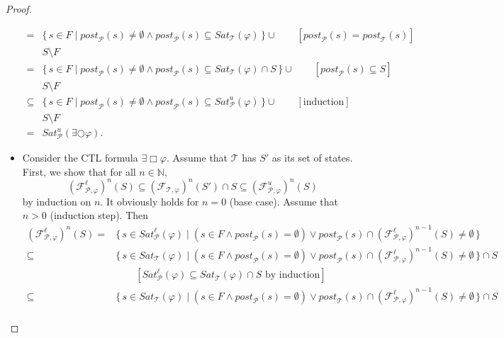 \documentclass[12pt]{article}
\newcommand{\always}{\Box}
\newcommand{\nxt}{\bigcirc}
\theoremstyle{definition}
\newcommand{\comment}[1]{\hspace{2em}[\mbox{#1}]}
\begin{document}
\begin{proof}
\begin{itemize}
\begin{align*}
= & \{\, s \in F \mid \mathit{post}_{\mathcal{P}}(s) \not= \emptyset \wedge \mathit{post}_{\mathcal{P}}(s) \subseteq \mathit{Sat}_{\mathcal{T}}(\varphi) \,\} \cup
\comment{$\mathit{post}_{\mathcal{P}}(s) = \mathit{post}_{\mathcal{T}}(s)$}\\
& S \setminus F\\
= & \{\, s \in F \mid \mathit{post}_{\mathcal{P}}(s) \not= \emptyset \wedge \mathit{post}_{\mathcal{P}}(s) \subseteq \mathit{Sat}_{\mathcal{T}}(\varphi) \cap S \,\} \cup
\comment{$\mathit{post}_{\mathcal{P}}(s) \subseteq S$}\\
& S \setminus F\\
\subseteq & \{\, s \in F \mid \mathit{post}_{\mathcal{P}}(s) \not= \emptyset \wedge \mathit{post}_{\mathcal{P}}(s) \subseteq \mathit{Sat}^u_{\mathcal{P}}(\varphi)  \,\} \cup
\comment{induction}\\
& S \setminus F\\
= & \mathit{Sat}^u_{\mathcal{P}}(\exists \nxt \varphi).
\end{align*}
\item
Consider the CTL formula $\exists \always \varphi$.  Assume that $\mathcal{T}$ has $S'$ as its set of states.  First, we show that for all $n \in \mathbb{N}$,
\[
(\mathcal{F}_{\mathcal{P}, \varphi}^{\ell})^n(S)
\subseteq (\mathcal{F}_{\mathcal{T}, \varphi})^{n}(S') \cap S
\subseteq (\mathcal{F}_{\mathcal{P}, \varphi}^{u})^n(S)
\]
by induction on $n$.  It obviously holds for $n=0$ (base case).  Assume that $n>0$ (induction step).  Then
\begin{align*}
(\mathcal{F}_{\mathcal{P}, \varphi}^{\ell})^n(S)
= & \{\, s \in \mathit{Sat}^{\ell}_{\mathcal{P}}(\varphi) \mid (s \in F \wedge \mathit{post}_{\mathcal{P}}(s) = \emptyset) \vee \mathit{post}_{\mathcal{P}}(s) \cap (\mathcal{F}_{\mathcal{P}, \varphi}^{\ell})^{n-1}(S) \not= \emptyset \,\}\\
\subseteq & \{\, s \in \mathit{Sat}_{\mathcal{T}}(\varphi) \mid (s \in F \wedge \mathit{post}_{\mathcal{P}}(s) = \emptyset) \vee \mathit{post}_{\mathcal{P}}(s) \cap  (\mathcal{F}_{\mathcal{P}, \varphi}^{\ell})^{n-1}(S) \not= \emptyset \,\} \cap S\\
& \comment{$\mathit{Sat}^{\ell}_{\mathcal{P}}(\varphi) \subseteq \mathit{Sat}_{\mathcal{T}}(\varphi) \cap S$ by induction}\\
\subseteq & \{\, s \in \mathit{Sat}_{\mathcal{T}}(\varphi) \mid (s \in F \wedge \mathit{post}_{\mathcal{P}}(s) = \emptyset) \vee \mathit{post}_{\mathcal{T}}(s) \cap (\mathcal{F}_{\mathcal{P}, \varphi}^{\ell})^{n-1}(S) \not= \emptyset \,\} \cap S\\

\end{align*}
\end{itemize}
\end{proof}
\end{document}

